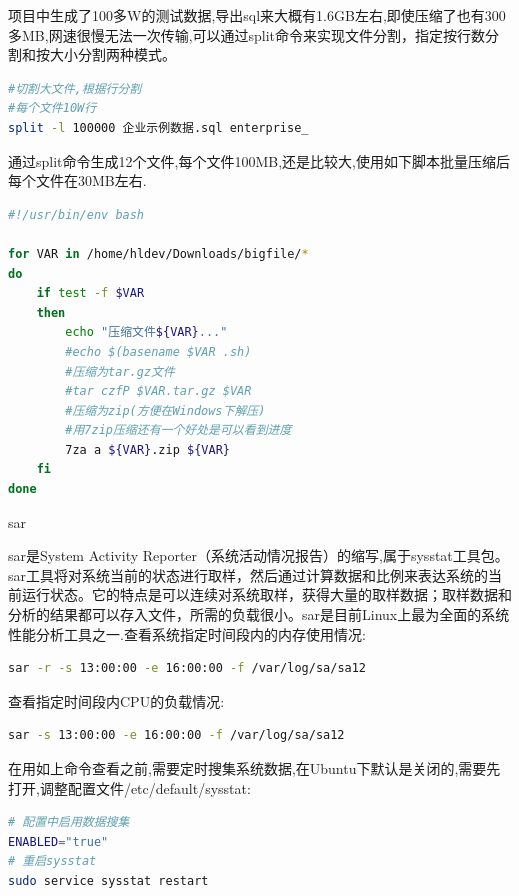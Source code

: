 \documentclass[12pt]{book}
\makeatletter
\numberwithin{dummy}{section}
\theoremstyle{ocrenumbox}
\theoremstyle{blacknumex}
\theoremstyle{blacknumbox}
\theoremstyle{ocrenum}
\renewcommand\paragraph{\@startsection{paragraph}{4}{\z@}
	{-2ex \@plus-.2ex \@minus .2ex}
	{.1ex}
	{\normalfont\small\sffamily\bfseries}}
\makeatother
\begin{document}
项目中生成了100多W的测试数据,导出sql来大概有1.6GB左右,即使压缩了也有300多MB,网速很慢无法一次传输,可以通过split命令来实现文件分割，指定按行数分割和按大小分割两种模式。

\begin{lstlisting}[language=Bash]
#切割大文件,根据行分割
#每个文件10W行
split -l 100000 企业示例数据.sql enterprise_
\end{lstlisting}

通过split命令生成12个文件,每个文件100MB,还是比较大,使用如下脚本批量压缩后每个文件在30MB左右.

\begin{lstlisting}[language=Bash]
#!/usr/bin/env bash

for VAR in /home/hldev/Downloads/bigfile/*
do
	if test -f $VAR
	then
		echo "压缩文件${VAR}..."
		#echo $(basename $VAR .sh)
		#压缩为tar.gz文件
		#tar czfP $VAR.tar.gz $VAR
		#压缩为zip(方便在Windows下解压)
		#用7zip压缩还有一个好处是可以看到进度
		7za a ${VAR}.zip ${VAR}
	fi    
done
\end{lstlisting}

\paragraph{sar}

sar是System Activity Reporter（系统活动情况报告）的缩写,属于sysstat工具包。sar工具将对系统当前的状态进行取样，然后通过计算数据和比例来表达系统的当前运行状态。它的特点是可以连续对系统取样，获得大量的取样数据；取样数据和分析的结果都可以存入文件，所需的负载很小。sar是目前Linux上最为全面的系统性能分析工具之一.查看系统指定时间段内的内存使用情况:

\begin{lstlisting}[language=Bash]
sar -r -s 13:00:00 -e 16:00:00 -f /var/log/sa/sa12
\end{lstlisting}

查看指定时间段内CPU的负载情况:

\begin{lstlisting}[language=Bash]
sar -s 13:00:00 -e 16:00:00 -f /var/log/sa/sa12
\end{lstlisting}

在用如上命令查看之前,需要定时搜集系统数据,在Ubuntu下默认是关闭的,需要先打开,调整配置文件/etc/default/sysstat:

\begin{lstlisting}[language=Bash]
# 配置中启用数据搜集
ENABLED="true"
# 重启sysstat
sudo service sysstat restart
\end{lstlisting}
	
\end{document}
